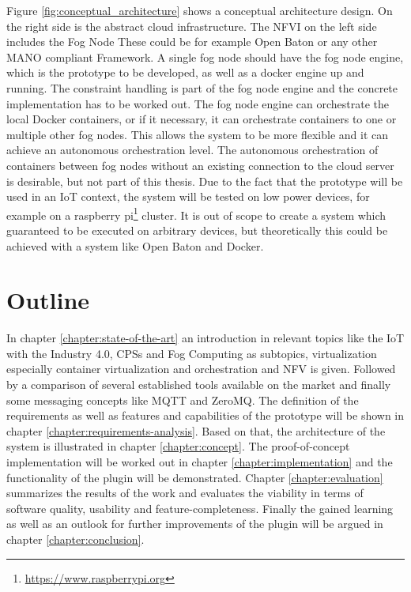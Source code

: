 Figure \ref{fig:conceptual_architecture} shows a conceptual architecture design.
On the right side is the abstract cloud infrastructure.
The \ac{NFVI} on the left side includes the Fog Node
These could be for example Open Baton or any other \ac{MANO} compliant Framework.
A single fog node should have the fog node engine, which is the prototype to be developed, as well as a docker engine up and running.
The constraint handling is part of the fog node engine and the concrete implementation has to be worked out.
The fog node engine can orchestrate the local Docker containers, or if it necessary, it can orchestrate containers to one or multiple other fog nodes.
This allows the system to be more flexible and it can achieve an autonomous orchestration level.
The autonomous orchestration of containers between fog nodes without an existing connection to the cloud server is desirable, but not part of this thesis.
Due to the fact that the prototype will be used in an \ac{IoT} context, the system will be tested on low power devices, for example on a raspberry pi\footnote{\url{https://www.raspberrypi.org}} cluster.
It is out of scope to create a system which guaranteed to be executed on arbitrary devices, but theoretically this could be achieved with a system like Open Baton and Docker.


\section{Outline}
In chapter \ref{chapter:state-of-the-art} an introduction in relevant topics like the \ac{IoT} with the Industry 4.0, \acp{CPS} and Fog Computing as subtopics, virtualization especially container virtualization and orchestration and \ac{NFV} is given.
Followed by a comparison of several established tools available on the market and finally some messaging concepts like \ac{MQTT} and ZeroMQ.
The definition of the requirements as well as features and capabilities of the prototype will be shown in chapter \ref{chapter:requirements-analysis}.
Based on that, the architecture of the system is illustrated in chapter \ref{chapter:concept}.
The proof-of-concept implementation will be worked out in chapter \ref{chapter:implementation} and the functionality of the plugin will be demonstrated.
Chapter \ref{chapter:evaluation} summarizes the results of the work and evaluates the viability in terms of software quality, usability and feature-completeness.
Finally the gained learning as well as an outlook for further improvements of the plugin will be argued in chapter \ref{chapter:conclusion}.

